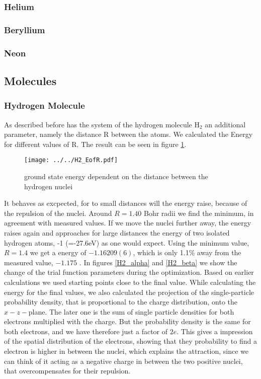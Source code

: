 \documentclass[a4paper,10pt]{article}
\begin{document}
\subsubsection{Helium}
\subsubsection{Beryllium}
\subsubsection{Neon}

\subsection{Molecules}
\subsubsection{Hydrogen Molecule}
As described before has the system of the hydrogen molecule $\text{H}_2$ an additional parameter, namely the distance R between the atoms. 
We calculated the Energy for different values of R. The result can be seen in figure \ref{EofR}. 
\begin{figure}[htbp]
 \label{EofR}
 \texttt{[image: ../../H2\_EofR.pdf]}
 \caption{ground state energy dependent on the distance between the hydrogen nuclei}
\end{figure}
It behaves as excpected, for to small distances 
will the energy raise, because of the repulsion of the nuclei. Around $R=1.40$ Bohr radii we find the minimum, in agreement with measured values. 
If we move the nuclei further away, the energy raises again and approaches for large distances the energy of two isolated hydrogen atoms, -1 (=-27.6eV) as one would expect.
Using the minimum value, $R=1.4$ we get a energy of $-1.16209(6)$, which is only 1.1\% away from the measured value, $-1.175$ .
In figures \ref{H2_alpha} and \ref{H2_beta}
we show the change of the trial function parameters during the optimization. Based on earlier calculations we used 
starting points close to the final value. 
While calculating the energy for the final values, we also calculated the projection
of the single-particle probability density, that is proportional to the charge distribution, 
onto the $x-z-$plane. 
The later one is the sum of single particle densities for both electrons multiplied with the charge.
But the probability density is the same for both electrons, and we have therefore just a factor of $2e$. 
This gives a impression of the spatial distribution of the electrons, showing that they probability to find a electron is higher in between the
nuclei, which explains the attraction, since we can think of it acting as a negative charge in between the two positive nuclei, that overcompensates for their repulsion. 
\end{document}
